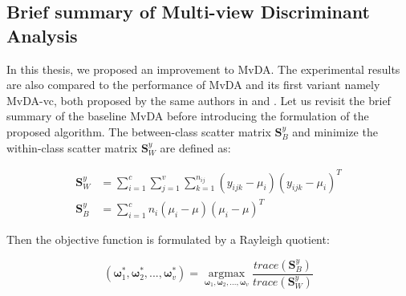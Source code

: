 
\subsection{Brief summary of Multi-view Discriminant Analysis}
    In this thesis, we proposed an improvement to MvDA.
    The experimental results are also compared to the performance of MvDA and its first variant namely MvDA-vc, both proposed by the same authors in \cite{kan2015multi} and \cite{kan2016multi}.
    Let us revisit the brief summary of the baseline MvDA before introducing the formulation of the proposed algorithm.
    The between-class scatter matrix $\boldsymbol{S}_B^y$ and minimize the within-class scatter matrix $\boldsymbol{S}_W^y$ are defined as: 

    \begin{align}
        \boldsymbol{S}_W^y &= \sum_{i=1}^{c}\sum_{j=1}^{v}\sum_{k=1}^{n_{ij}}(y_{ijk}-\mu_i)(y_{ijk}-\mu_i)^T \\
        \boldsymbol{S}_B^y &= \sum_{i=1}^{c}n_i(\mu_i - \mu)(\mu_i - \mu)^T
    \end{align}

    Then the objective function is formulated by a Rayleigh quotient:

    \begin{equation}
        (\boldsymbol{\omega}_1^*,\boldsymbol{\omega}_2^*, ..., \boldsymbol{\omega}_v^*) = \operatorname*{argmax}_{\boldsymbol{\omega}_1, \boldsymbol{\omega}_2,..., \boldsymbol{\omega}_v}\frac{trace(\boldsymbol{S}_B^y)}{trace(\boldsymbol{S}_W^y)}
    \end{equation}


